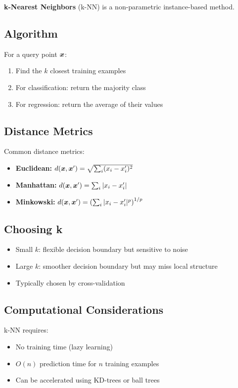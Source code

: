 \textbf{k-Nearest Neighbors} (k-NN) is a non-parametric instance-based method.

\subsection{Algorithm}

For a query point $\boldsymbol{x}$:
\begin{enumerate}
    \item Find the $k$ closest training examples
    \item For classification: return the majority class
    \item For regression: return the average of their values
\end{enumerate}

\subsection{Distance Metrics}

Common distance metrics:
\begin{itemize}
    \item \textbf{Euclidean:} $d(\boldsymbol{x}, \boldsymbol{x}') = \sqrt{\sum_i (x_i - x_i')^2}$
    \item \textbf{Manhattan:} $d(\boldsymbol{x}, \boldsymbol{x}') = \sum_i |x_i - x_i'|$
    \item \textbf{Minkowski:} $d(\boldsymbol{x}, \boldsymbol{x}') = \left(\sum_i |x_i - x_i'|^p\right)^{1/p}$
\end{itemize}

\subsection{Choosing k}

\begin{itemize}
    \item Small $k$: flexible decision boundary but sensitive to noise
    \item Large $k$: smoother decision boundary but may miss local structure
    \item Typically chosen by cross-validation
\end{itemize}

\subsection{Computational Considerations}

k-NN requires:
\begin{itemize}
    \item No training time (lazy learning)
    \item $O(n)$ prediction time for $n$ training examples
    \item Can be accelerated using KD-trees or ball trees
\end{itemize}

